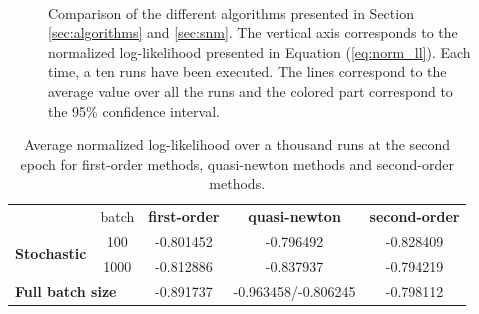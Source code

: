 \documentclass[conference]{IEEEtran}
\begin{document}
\begin{figure}[t]
    \centering
    ~
    ~
    \caption{Comparison of the different algorithms presented in Section \ref{sec:algorithms} and \ref{sec:snm}. The vertical axis corresponds to the normalized log-likelihood presented in Equation (\ref{eq:norm_ll}). Each time, a ten runs have been executed. The lines correspond to the average value over all the runs and the colored part correspond to the 95\% confidence interval.}
    \label{fig:comparison_algo}
    \vspace{-0.5cm}
\end{figure}

\begin{table}
\centering
\renewcommand\arraystretch{1.2}
\begin{tabular}{lc|ccc}
&\multicolumn{1}{c}{batch} & {\bf first-order} & {\bf quasi-newton} & {\bf second-order} \\ \cline{3-5}
\multirow{ 2}{*}{\bf Stochastic} & 100 & -0.801452 & -0.796492 & -0.828409 \\
& 1000 & -0.812886 & -0.837937 & -0.794219 \\
\multicolumn{2}{l|}{\bf Full batch size}  & -0.891737 & -0.963458/-0.806245 & -0.798112
\end{tabular}
\caption{\label{tab:comparison_algo} Average normalized log-likelihood over a thousand runs at the second epoch for first-order methods, quasi-newton methods and second-order methods.}
\vspace{-0.8cm}
\end{table}
\end{document}
